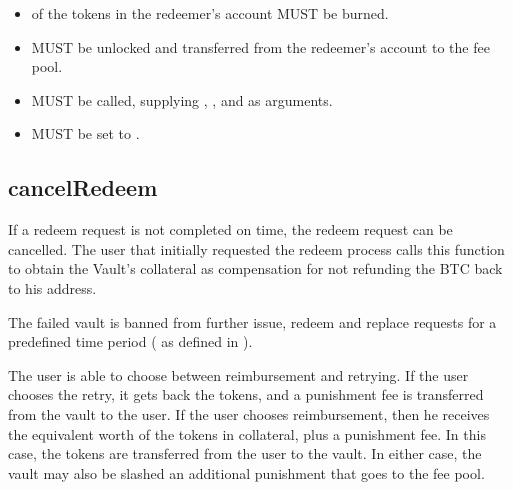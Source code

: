 \documentclass[a4paper,10pt,english]{sphinxmanual}
\begin{document}
\begin{itemize}
\item {} 
 of the tokens in the redeemer’s account MUST be burned.

\item {} 
 MUST be unlocked and transferred from the redeemer’s account to the fee pool.

\item {} 
{\hyperref[\detokenize{spec/vault-registry:redeemtokens}]{}} MUST be called, supplying , ,  and  as arguments.

\item {} 
 MUST be set to .

\end{itemize}


\subsection{cancelRedeem}
\label{\detokenize{spec/redeem:cancelredeem}}\label{\detokenize{spec/redeem:id10}}
If a redeem request is not completed on time, the redeem request can be cancelled.
The user that initially requested the redeem process calls this function to obtain the Vault’s collateral as compensation for not refunding the BTC back to his address.

The failed vault is banned from further issue, redeem and replace requests for a pre\sphinxhyphen{}defined time period ( as defined in {\hyperref[\detokenize{spec/vault-registry:vault-registry}]{}}).

The user is able to choose between reimbursement and retrying. If the user chooses the retry, it gets back the tokens, and a punishment fee is transferred from the vault to the user. If the user chooses reimbursement, then he receives the equivalent worth of the tokens in collateral, plus a punishment fee. In this case, the tokens are transferred from the user to the vault. In either case, the vault may also be slashed an additional punishment that goes to the fee pool.
\end{document}
